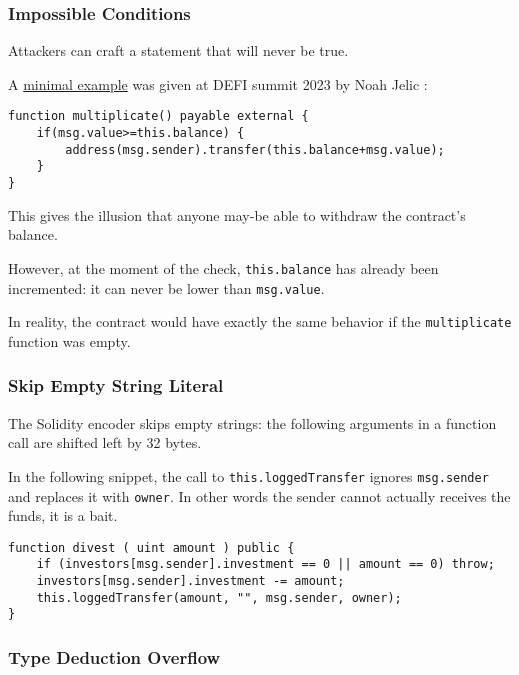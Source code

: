\subsubsection{Impossible Conditions}

Attackers can craft a statement that will never be true.

A \href{https://www.youtube.com/watch?v=4bSQWoy5a_k}{minimal example} was given at DEFI summit 2023 by Noah Jelic \cite{video-hacker-traps}:

\begin{lstlisting}[language=Solidity]
function multiplicate() payable external {
    if(msg.value>=this.balance) {
        address(msg.sender).transfer(this.balance+msg.value);
    }
}
\end{lstlisting}

This gives the illusion that anyone may-be able to withdraw the contract's balance.

However, at the moment of the check, \lstinline[language=Solidity]{this.balance} has already been incremented: it can never be lower than \lstinline[language=Solidity]{msg.value}.

In reality, the contract would have exactly the same behavior if the \lstinline{multiplicate} function was empty.

\subsubsection{Skip Empty String Literal}

The Solidity encoder skips empty strings: the following arguments in a function call are shifted left by 32 bytes.

In the following snippet, the call to \lstinline[language=Solidity]{this.loggedTransfer} ignores \lstinline[language=Solidity]{msg.sender} and replaces it with \lstinline[language=Solidity]{owner}.
In other words the sender cannot actually receives the funds, it is a bait.

\begin{lstlisting}[language=Solidity]
function divest ( uint amount ) public {
    if (investors[msg.sender].investment == 0 || amount == 0) throw;
    investors[msg.sender].investment -= amount;
    this.loggedTransfer(amount, "", msg.sender, owner);
}
\end{lstlisting}

\subsubsection{Type Deduction Overflow}

